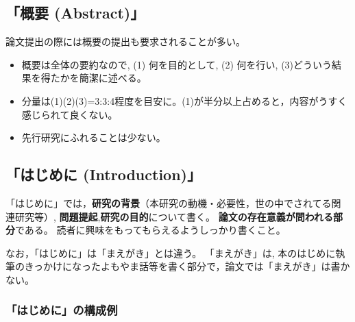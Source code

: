\documentclass[12pt, ]{jsarticle}
\providecommand{\tightlist}{%
   \setlength{\itemsep}{0pt}\setlength{\parskip}{0pt}}
\begin{document}
\subsection{「概要 (Abstract)」}\label{ux6982ux8981-abstract}

論文提出の際には概要の提出も要求されることが多い。

\begin{itemize}
\tightlist
\item
  概要は全体の要約なので, (1) 何を目的として, (2) 何を行い,
  (3)どういう結果を得たかを簡潔に述べる。
\item
  分量は(1)(2)(3)=3:3:4程度を目安に。(1)が半分以上占めると，内容がうすく感じられて良くない。
\item
  先行研究にふれることは少ない。
\end{itemize}

\subsection{「はじめに
(Introduction)」}\label{ux306fux3058ux3081ux306b-introduction}

「はじめに」では，\textbf{研究の背景}（本研究の動機・必要性，世の中でされてる関
連研究等）, \textbf{問題提起},\textbf{研究の目的}について書く。
\textbf{論文の存在意義が問われる部分}である。
読者に興味をもってもらえるようしっかり書くこと。

なお，「はじめに」は「まえがき」とは違う。 「まえがき」は,
本のはじめに執筆のきっかけになったよもやま話等を書く部分で，論文では「まえがき」は書かない。

\subsubsection{「はじめに」の構成例}\label{ux306fux3058ux3081ux306bux306eux69cbux6210ux4f8b}
\end{document}
